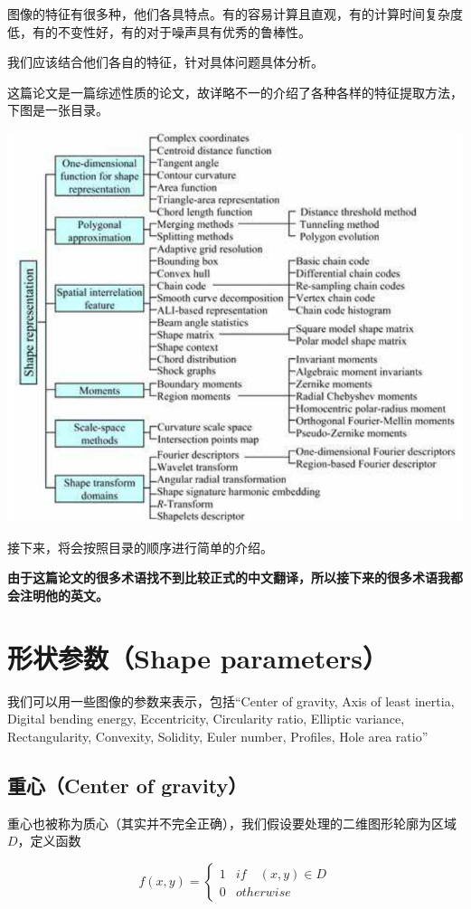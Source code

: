 \documentclass{ctexart}
\begin{document}
图像的特征有很多种，他们各具特点。有的容易计算且直观，有的计算时间复杂度低，有的不变性好，有的对于噪声具有优秀的鲁棒性。

我们应该结合他们各自的特征，针对具体问题具体分析。

这篇论文是一篇综述性质的论文，故详略不一的介绍了各种各样的特征提取方法，下图是一张目录。

\includegraphics{1.png}

接下来，将会按照目录的顺序进行简单的介绍。

\textbf{由于这篇论文的很多术语找不到比较正式的中文翻译，所以接下来的很多术语我都会注明他的英文。}

\section{形状参数（Shape parameters）}
我们可以用一些图像的参数来表示，包括“Center of gravity, Axis of least inertia, Digital bending energy, Eccentricity, Circularity ratio, Elliptic variance, Rectangularity, Convexity, Solidity, Euler number, Profiles, Hole area ratio”

\subsection{重心（Center of gravity）}
重心也被称为质心（其实并不完全正确），我们假设要处理的二维图形轮廓为区域$D$，定义函数

\[f(x,y)=\begin{cases}1 & if\quad (x,y) \in D \\ 0 & otherwise\end{cases}\]
\end{document}
